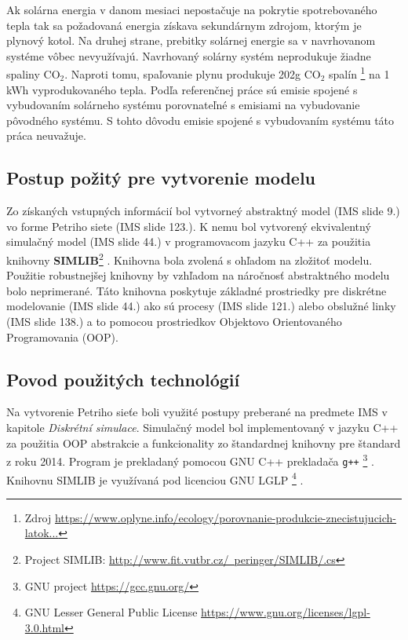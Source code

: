 \documentclass[a4paper, 11pt]{article}
\begin{document}
Ak solárna energia v danom mesiaci nepostačuje na pokrytie spotrebovaného tepla tak sa požadovaná energia získava sekundárnym zdrojom, ktorým je plynový kotol. Na druhej strane, prebitky solárnej energie sa v navrhovanom systéme vôbec nevyužívajú. Navrhovaný solárny systém neprodukuje žiadne spaliny CO$_2$. Naproti tomu, spaľovanie plynu produkuje 202g CO$_2$ spalín \footnote{Zdroj \href{https://www.oplyne.info/ecology/porovnanie-produkcie-znecistujucich-latok-so2-tzl-nox-co-a-sklenikoveho-plynu-co2-vyprodukovanych-spalinami-v-rodinnom-dome-vykurovanie-drevom-ciernym-hnedym-uhlim-a-zemnym-plynom/}{https://www.oplyne.info/ecology/porovnanie-produkcie-znecistujucich-latok...}}  na 1 kWh vyprodukovaného tepla. Podľa referenčnej práce sú emisie spojené s vybudovaním solárneho systému porovnateľné s emisiami na vybudovanie pôvodného systému. S tohto dôvodu emisie spojené s vybudovaním systému táto práca neuvažuje. 

\subsection{Postup požitý pre vytvorenie modelu}

Zo získaných vstupných informácií bol vytvorneý abstraktný model (IMS\cite{ims_slides} slide 9.) vo forme Petriho siete (IMS\cite{ims_slides} slide 123.). K nemu bol vytvorený ekvivalentný simulačný model (IMS\cite{ims_slides} slide 44.) v programovacom jazyku C++ za použitia knihovny \textbf{SIMLIB}\footnote{Project SIMLIB: \href{http://www.fit.vutbr.cz/~peringer/SIMLIB/.cs}{http://www.fit.vutbr.cz/~peringer/SIMLIB/.cs}} . Knihovna bola zvolená s ohľadom na zložitoť modelu. Použitie robustnejšej knihovny by vzhľadom na náročnosť abstraktného modelu bolo neprimerané. Táto knihovna poskytuje základné prostriedky pre diskrétne modelovanie (IMS\cite{ims_slides} slide 44.) ako sú procesy (IMS\cite{ims_slides} slide 121.) alebo obslužné linky (IMS\cite{ims_slides} slide 138.) a to pomocou prostriedkov Objektovo Orientovaného Programovania (OOP).

\subsection{Povod použitých technológií}
Na vytvorenie Petriho sieťe boli využité postupy preberané na predmete IMS\cite{ims_slides} v kapitole \textit{Diskrétní simulace}. Simulačný model bol implementovaný v jazyku C++ za použitia OOP abstrakcie a funkcionality zo štandardnej knihovny pre štandard z roku 2014. Program je prekladaný pomocou GNU C++ prekladača \texttt{g++} \footnote{GNU project \href{https://gcc.gnu.org/}{https://gcc.gnu.org/}} . Knihovnu SIMLIB  je využívaná pod licenciou GNU LGLP \footnote{GNU Lesser General Public License \href{https://www.gnu.org/licenses/lgpl-3.0.html}{https://www.gnu.org/licenses/lgpl-3.0.html}} . 
\end{document}

